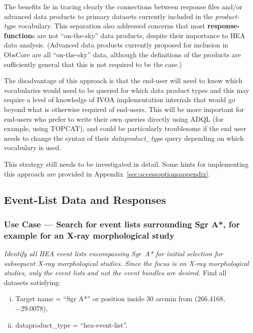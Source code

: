 \begin{itemize}
The benefits lie in tracing clearly the connections between response files and/or advanced data products to primary datasets currently included in the \textsl{product-type} vocabulary.  This separation also addressed concerns that most {\bf response-function}s are not ``on-the-sky'' data products, despite their importance to \gls{HEA} data analysis.  (Advanced data products currently proposed for inclusion in ObsCore are all ``on-the-sky'' data, although the definitions of the products are sufficiently general that this is not required to be the case.)

The disadvantage of this approach is that the end-user will need to know which vocabularies would need to be queried for which data product types and this may require a level of knowledge of IVOA implementation internals that would go beyond what is otherwise required of end-users.  This will be more important for end-users who prefer to write their own queries directly using ADQL (for example, using TOPCAT), and could be particularly troublesome if the end user needs to change the syntax of their {\em dataproduct\_type\/} query depending on which vocabulary is used.

This strategy still needs to be investigated in detail.  Some hints for implementing this approach are provided in Appendix~\ref{sec:accessoptionsappendix}. 
\end{itemize}

\pagebreak

\subsection{Event-List Data and Responses}

\subsubsection{Use Case --- Search for event lists surrounding Sgr A*, for example for an X-ray morphological study}

{\em Identify all \gls{HEA} event lists encompassing Sgr~A* for initial selection for subsequent X-ray morphological studies.  Since the focus is on X-ray morphological studies, only the event lists and not the event bundles are desired.\/}
\medskip
\noindent Find all datasets satisfying:
\begin{enumerate}[(i)]
  \item Target name = ``Sgr A*'' or position inside 30 arcmin from (266.4168, $-29.0078$),
  \item dataproduct\_type = ``hea-event-list''.
\end{enumerate}

